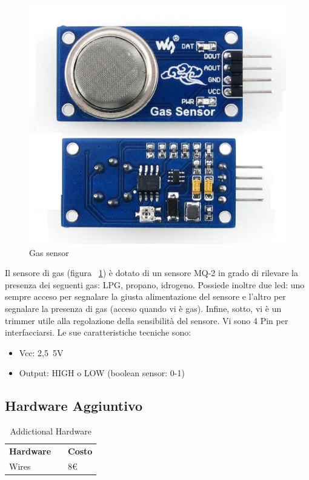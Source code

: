 \begin{figure}
	\centering
	\includegraphics[width=0.7\linewidth]{Figures/Sensors&Rasp/mq-2}
	\caption[gas]{Gas sensor}
	\label{fig:mq2}
\end{figure}

Il sensore di gas (figura ~\ref{fig:mq2}) è dotato di un sensore MQ-2 in grado di rilevare la presenza dei seguenti gas:  LPG, propano, idrogeno. Possiede inoltre due led: uno sempre acceso per segnalare la giusta alimentazione del sensore e l'altro per segnalare la presenza di gas (acceso quando vi è gas). Infine, sotto, vi è un trimmer utile alla regolazione della sensibilità del sensore. Vi sono 4 Pin per interfacciarsi.
Le sue caratteristiche tecniche sono: 

\begin{itemize}
	\item Vcc: 2,5~5V
	 \item Output: HIGH o LOW (boolean sensor: 0-1)
\end{itemize}

\newpage

\subsection{Hardware Aggiuntivo}

\begin{table}[]
\centering
\begin{tabular}{lll}
\multicolumn{1}{c}{\textbf{Hardware}} &  & \multicolumn{1}{c}{\textbf{Costo}} \\
Wires                                 &  &                   8\euro                \\

\end{tabular}
\caption{Addictional Hardware}


\label{Addictional Hardware}
\end{table}

\newpage
